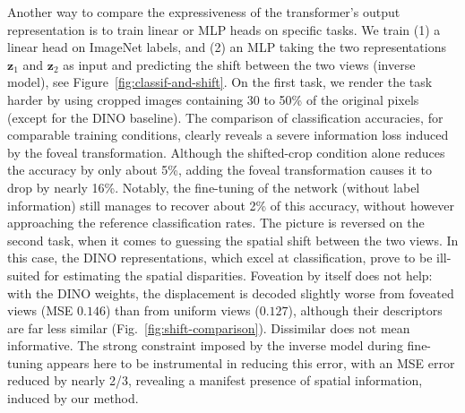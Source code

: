 \documentclass{article}
\begin{document}
Another way to compare the expressiveness of the transformer's output representation is to train linear or MLP heads on specific tasks. We train (1) a linear head on ImageNet labels, and (2) an MLP taking the two representations $\boldsymbol{z}_1$ and $\boldsymbol{z}_2$ as input and predicting the shift between the two views (inverse model), see Figure~\ref{fig:classif-and-shift}. On the first task, we render the task harder by using cropped images containing 30 to 50\% of the original pixels (except for the DINO baseline). The comparison of classification accuracies, for comparable training conditions, clearly reveals a severe information loss induced by the foveal transformation. Although the shifted-crop condition alone reduces the accuracy by only about 5\%, adding the foveal transformation causes it to drop by nearly 16\%. Notably, the fine-tuning of the network (without label information) still manages to recover about 2\% of this accuracy, without however approaching the reference classification rates. The picture is reversed on the second task, when it comes to guessing the spatial shift between the two views. In this case, the DINO representations, which excel at classification, prove to be ill-suited for estimating the spatial disparities.
Foveation by itself does not help: with the DINO weights, the displacement is decoded slightly worse from foveated views (MSE $0.146$) than from uniform views ($0.127$), although their descriptors are far less similar (Fig.~\ref{fig:shift-comparison}). Dissimilar does not mean informative. The strong constraint imposed by the inverse model during fine-tuning appears here to be instrumental in reducing this error, with an MSE error reduced by nearly 2/3, revealing a manifest presence of spatial information, induced by our method.

\end{document}
